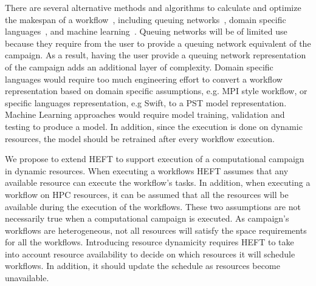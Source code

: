 There are several alternative methods and algorithms to calculate and optimize the makespan of a workflow~\cite{lu2019review}, including queuing networks~\cite{yao2019throughput,bao2019performance}, domain specific languages~\cite{carothers2017durango,maheshwari2016workflow}, and machine learning~\cite{witt2019predictive,pumma2017runtime}.
Queuing networks will be of limited use because they require from the user to provide a queuing network equivalent of the campaign.
As a result, having the user provide a queuing network representation of the campaign adds an additional layer of complexity.
Domain specific languages would require too much engineering effort to convert a workflow representation based on domain specific assumptions, e.g. MPI style workflow, or specific languages representation, e.g Swift, to a PST model representation.
Machine Learning approaches would require model training, validation and testing to produce a model.
In addition, since the execution is done on dynamic resources, the model should be retrained after every workflow execution.

We propose to extend HEFT to support execution of a computational campaign in dynamic resources.
When executing a workflows HEFT assumes that any available resource can execute the workflow's tasks.
In addition, when executing a workflow on HPC resources, it can be assumed that all the resources will be available during the execution of the workflows.
These two assumptions are not necessarily true when a computational campaign is executed.
As campaign's workflows are heterogeneous, not all resources will satisfy the space requirements for all the workflows.
Introducing resource dynamicity requires HEFT to take into account resource availability to decide on which resources it will schedule workflows.
In addition, it should update the schedule as resources become unavailable.

